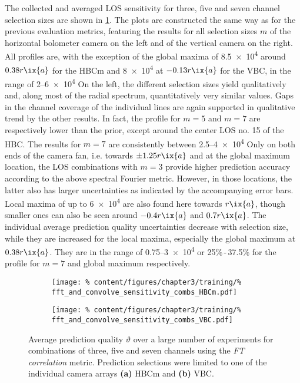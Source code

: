                 The collected and averaged LOS sensitivity for three, five and seven channel selection sizes are shown in \cref{fig:results_fourier_correlation}. The plots are constructed the same way as for the previous evaluation metrics, featuring the results for all selection sizes $m$ of the horizontal bolometer camera on the left and of the vertical camera on the right. All profiles are, with the exception of the global maxima of \SI{8.5e4}{\arbitraryunit} around $0.38r\ix{a}$ for the HBCm and \SI{8e4}{\arbitraryunit} at $-0.13r\ix{a}$ for the VBC, in the range of \SIrange{2}{6e4}{\arbitraryunit} On the left, the different selection sizes yield qualitatively and, along most of the radial spectrum, quantitatively very similar values. Gaps in the channel coverage of the individual lines are again supported in qualitative trend by the other results. In fact, the profile for $m=5$ and $m=7$ are respectively lower than the prior, except around the center LOS no. 15 of the HBC. The results for $m=7$ are consistently between \SIrange{2.5}{4e4}{\arbitraryunit} Only on both ends of the camera fan, i.e. towards $\pm1.25r\ix{a}$ and at the global maximum location, the LOS combinations with $m=3$ provide higher prediction accuracy according to the above spectral Fourier metric. However, in those locations, the latter also has larger uncertainties as indicated by the accompanying error bars. Local maxima of up to \SI{6e4}{\arbitraryunit} are also found here towards $r\ix{a}$, though smaller ones can also be seen around $-0.4r\ix{a}$ and $0.7r\ix{a}$. The individual average prediction quality uncertainties decrease with selection size, while they are increased for the local maxima, especially the global maximum at $0.38r\ix{a}$. They are in the range of \SIrange{0.75}{3e4}{\arbitraryunit} or 25\%\,-\,37.5\% for the profile for $m=7$ and global maximum respectively.\\%
%
                \begin{figure}[t]%
                    \centering%
                    \begin{subfigure}{0.47\textwidth}%
                        \texttt{[image: \%
                            content/figures/chapter3/training/\%
                            fft\_and\_convolve\_sensitivity\_combs\_HBCm.pdf]}%
                        \caption{}%
                    \end{subfigure}%
                    \hfill%
                    \begin{subfigure}{0.47\textwidth}%
                        \texttt{[image: \%
                            content/figures/chapter3/training/\%
                            fft\_and\_convolve\_sensitivity\_combs\_VBC.pdf]}%
                        \caption{}%
                    \end{subfigure}%
                    \caption{Average prediction quality $\vartheta$ over a large number of experiments for combinations of three, five and seven channels using the \textit{FT correlation} metric. Prediction selections were limited to one of the individual camera arrays \textbf{(a)} HBCm and \textbf{(b)} VBC.}\label{fig:results_fourier_correlation}%
                \end{figure}%
